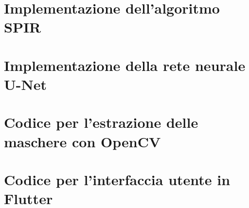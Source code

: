 \documentclass[a4paper,12pt]{report}
\begin{document}
  \section{Implementazione dell'algoritmo SPIR}
  \section{Implementazione della rete neurale U-Net}
  \section{Codice per l'estrazione delle maschere con OpenCV}
  \section{Codice per l'interfaccia utente in Flutter}

  
  
\end{document}
